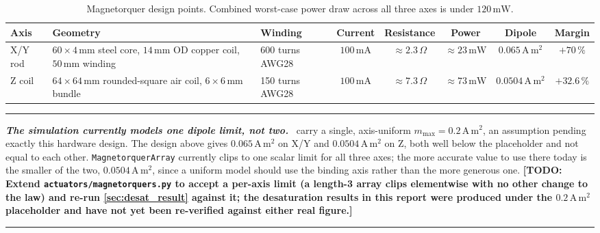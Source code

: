 \documentclass[conference,10pt,a4paper]{IEEEtran}
\newcommand{\remarkrule}{\par\nobreak\vspace{2pt}%
  \hrule height 0.4pt\vspace{4pt}\nobreak}
\newenvironment{cautionbox}[1][Caveat]
  {\par\medskip\remarkrule\noindent\small\textbf{\textit{#1.}}\ \ignorespaces}
  {\par\vspace{3pt}\hrule height 0.4pt\par\medskip\ignorespacesafterend}
\newcommand{\TODO}[1]{\textbf{[TODO: #1]}}
\newcommand{\TODO}[1]{}
\newcommand{\unit}[1]{\ensuremath{\,\mathrm{#1}}}
\begin{document}
\begin{table}[!t]
\centering
\caption{Magnetorquer design points. Combined worst-case power draw across all
three axes is under $120\unit{mW}$.}
\label{tab:magnetorquer}
\footnotesize
\begin{tabularx}{\textwidth}{@{}lXlccccc@{}}
\toprule
\textbf{Axis} & \textbf{Geometry} & \textbf{Winding} & \textbf{Current} &
\textbf{Resistance} & \textbf{Power} & \textbf{Dipole} & \textbf{Margin} \\
\midrule
X/Y rod & $60\times4\unit{mm}$ steel core, $14\unit{mm}$ OD copper coil,
  $50\unit{mm}$ winding & 600 turns AWG28 & $100\unit{mA}$ & $\approx2.3\,\Omega$
  & $\approx23\unit{mW}$ & $0.065\unit{A\,m^2}$ & $+70\,\%$ \\
Z coil & $64\times64\unit{mm}$ rounded-square air coil, $6\times6\unit{mm}$
  bundle & 150 turns AWG28 & $100\unit{mA}$ & $\approx7.3\,\Omega$ &
  $\approx73\unit{mW}$ & $0.0504\unit{A\,m^2}$ & $+32.6\,\%$ \\
\bottomrule
\end{tabularx}
\end{table}

\begin{cautionbox}[The simulation currently models one dipole limit, not two]
 carry a single, axis-uniform
$m_\text{max}=0.2\unit{A\,m^2}$, an assumption pending exactly this hardware
design. The design above gives $0.065\unit{A\,m^2}$ on X/Y and
$0.0504\unit{A\,m^2}$ on Z, both well below the placeholder and not equal to
each other. \texttt{MagnetorquerArray} currently clips to one scalar limit for
all three axes; the more accurate value to use there today is the smaller of
the two, $0.0504\unit{A\,m^2}$, since a uniform model should use the binding
axis rather than the more generous one. \TODO{Extend
\texttt{actuators/magnetorquers.py} to accept a per-axis limit (a length-3
array clips elementwise with no other change to the law) and re-run
\cref{sec:desat_result} against it; the desaturation results in this report
were produced under the $0.2\unit{A\,m^2}$ placeholder and have not yet been
re-verified against either real figure.}
\end{cautionbox}
\end{document}
